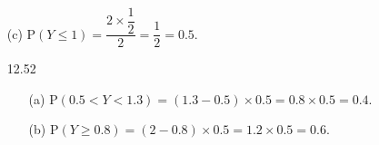 \documentclass[11pt, a4paper]{article}
\begin{document}
\begin{itemize}
\begin{itemize}
\begin{figure}[h]
\begin{tikzpicture}
    \end{tikzpicture}
\end{figure}
\end{itemize}

\item[]

\item[(c)]
$\text{P}(Y \leq 1) = \dfrac{2 \times \dfrac{1}{2}}{2} = \dfrac{1}{2} = 0.5$.

\item[]
\item[]

\item[12.52]
\begin{itemize}
\item[(a)]
$\text{P}(0.5 < Y < 1.3) = (1.3 - 0.5) \times 0.5 = 0.8 \times 0.5 = 0.4$.

\item[]

\item[(b)]
$\text{P}(Y \geq 0.8) = (2 - 0.8) \times 0.5 = 1.2 \times 0.5 = 0.6$.
\end{itemize}

\end{itemize}
\end{document}
